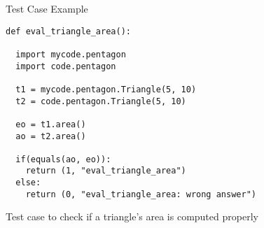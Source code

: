 \documentclass{beamer}
\begin{document}
\begin{frame}[fragile]{Test Case}
{Example}

\begin{lstlisting}[frame=single]
def eval_triangle_area():

  import mycode.pentagon
  import code.pentagon

  t1 = mycode.pentagon.Triangle(5, 10)
  t2 = code.pentagon.Triangle(5, 10)

  eo = t1.area()
  ao = t2.area()
  
  if(equals(ao, eo)):
    return (1, "eval_triangle_area")
  else:
    return (0, "eval_triangle_area: wrong answer")
\end{lstlisting}

\begin{center}
Test case to check if a triangle's area is computed properly
\end{center}
\end{frame}
\end{document}
